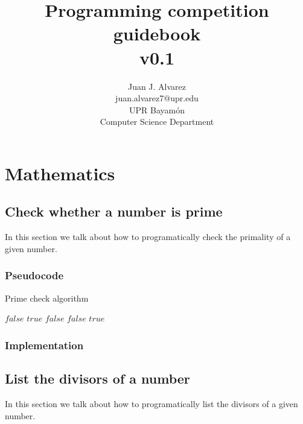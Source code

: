 \documentclass[letterpaper]{article}
\title{Programming competition guidebook \\ v0.1}
\author{
  Juan J. Alvarez \\
  juan.alvarez7@upr.edu \\
  UPR Bayam\'{o}n \\
  Computer Science Department
}
\date{}
\begin{document}
  \maketitle

  \tableofcontents

  \newpage

  \section{Mathematics}

    \subsection{Check whether a number is prime}
      In this section we talk about how to programatically check the primality of a given number.

      \subsubsection{Pseudocode}
        \begin{algorithm}
          \caption{Prime check algorithm}
          \begin{algorithmic}[1]
                \Return $false$
              \EndIf
                \Return $true$
              \EndIf
                \Return $false$
              \EndIf
                  \Return $false$
                \EndIf
              \EndFor
              \Return $true$
            \EndProcedure
          \end{algorithmic}
        \end{algorithm}

      \subsubsection{Implementation}
        

    \subsection{List the divisors of a number}
      In this section we talk about how to programatically list the divisors of a given number.
\end{document}

